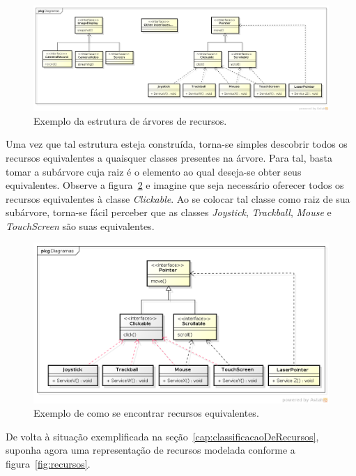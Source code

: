 \begin{figure}[ht]
	\center
	\includegraphics[scale=0.35]{imagens/hierarquiaDeRecursos}
	\caption{Exemplo da estrutura de árvores de recursos.}
	\label{fig:arvoreDeRecursos}
\end{figure}

Uma vez que tal estrutura esteja construída, torna-se simples descobrir todos os recursos equivalentes a quaisquer classes presentes na árvore. Para tal, basta tomar a subárvore cuja raiz é o elemento ao qual deseja-se obter seus equivalentes. Observe a figura~\ref{fig:tutorialDeEquivalencia} e imagine que seja necessário oferecer todos os recursos equivalentes à classe \emph{Clickable}. Ao se colocar tal classe como raiz de sua subárvore, torna-se fácil perceber que as classes \emph{Joystick}, \emph{Trackball}, \emph{Mouse} e \emph{TouchScreen} são suas equivalentes.

\begin{figure}[ht]
	\center
	\includegraphics[scale=0.55]{imagens/tutorialDeEquivalencia}
	\caption{Exemplo de como se encontrar recursos equivalentes.}
	\label{fig:tutorialDeEquivalencia}
\end{figure}

De volta à situação exemplificada na seção~\ref{cap:classificacaoDeRecursos}, suponha agora uma representação de recursos modelada conforme a figura~\ref{fig:recursos}. 

